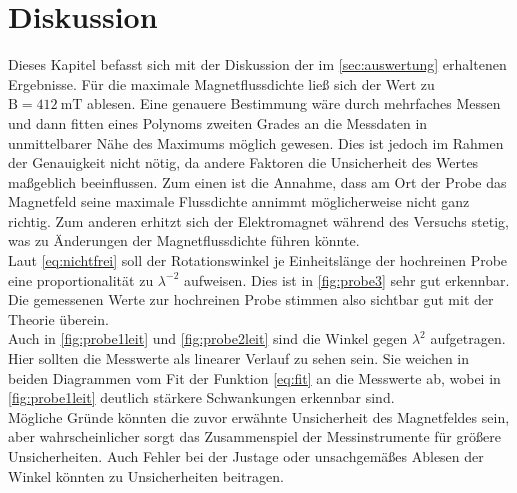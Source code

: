 

\section{Diskussion}
\label{sec:Diskussion}

Dieses Kapitel befasst sich mit der Diskussion der im \autoref{sec:auswertung} erhaltenen Ergebnisse.
Für die maximale Magnetflussdichte ließ sich der Wert zu $\text{B} = \SI{412}{\milli\tesla}$ ablesen.
Eine genauere Bestimmung wäre durch mehrfaches Messen und dann fitten eines Polynoms zweiten Grades an die Messdaten in unmittelbarer Nähe des Maximums möglich gewesen.
Dies ist jedoch im Rahmen der Genauigkeit nicht nötig, da andere Faktoren die Unsicherheit des Wertes maßgeblich beeinflussen.
Zum einen ist die Annahme, dass am Ort der Probe das Magnetfeld seine maximale Flussdichte annimmt möglicherweise nicht ganz richtig.
Zum anderen erhitzt sich der Elektromagnet während des Versuchs stetig, was zu Änderungen der Magnetflussdichte führen könnte.\\

Laut \autoref{eq:nichtfrei} soll der Rotationswinkel je Einheitslänge der hochreinen Probe eine proportionalität zu $\lambda^{-2}$ aufweisen.
Dies ist in \autoref{fig:probe3} sehr gut erkennbar.
Die gemessenen Werte zur hochreinen Probe stimmen also sichtbar gut mit der Theorie überein.\\
Auch in \autoref{fig:probe1leit} und \autoref{fig:probe2leit} sind die Winkel gegen $\lambda^2$ aufgetragen.
Hier sollten die Messwerte als linearer Verlauf zu sehen sein.
Sie weichen in beiden Diagrammen vom Fit der Funktion \autoref{eq:fit} an die Messwerte ab, wobei in \autoref{fig:probe1leit} deutlich stärkere Schwankungen erkennbar sind.\\
Mögliche Gründe könnten die zuvor erwähnte Unsicherheit des Magnetfeldes sein, aber wahrscheinlicher sorgt das Zusammenspiel der Messinstrumente für größere Unsicherheiten.
Auch Fehler bei der Justage oder unsachgemäßes Ablesen der Winkel könnten zu Unsicherheiten beitragen.\\

